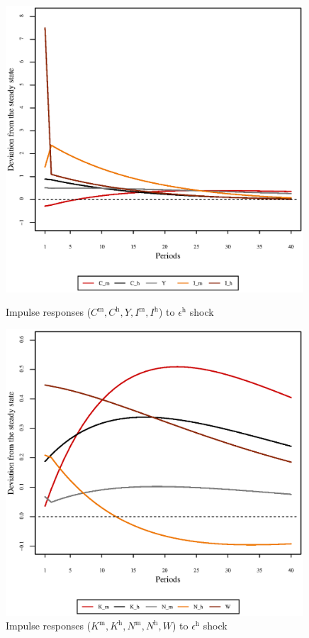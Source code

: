 \begin{figure}[h]
\begin{minipage}{0.5\textwidth}
\vspace*{-3em}
\centering
\includegraphics[width=0.99\textwidth, scale=0.55]{plots/plot_1.eps}
\caption{Impulse responses ($C^{\mathrm{m}}, C^{\mathrm{h}}, Y, I^{\mathrm{m}}, I^{\mathrm{h}}$) to $\epsilon^{\mathrm{h}}$ shock}
\end{minipage}
\begin{minipage}{0.5\textwidth}
\vspace*{-3em}
\centering
\includegraphics[width=0.99\textwidth, scale=0.55]{plots/plot_2.eps}
\caption{Impulse responses ($K^{\mathrm{m}}, K^{\mathrm{h}}, N^{\mathrm{m}}, N^{\mathrm{h}}, W$) to $\epsilon^{\mathrm{h}}$ shock}
\end{minipage}
\end{figure}

